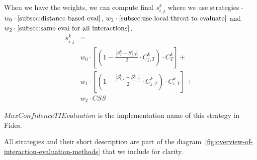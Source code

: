 When we have the weights, we can compute final $s^{k}_{i, j}$ where we use strategies - $w_{0} \cdot \ref{subsec:distance-based-eval}$, $w_{1} \cdot \ref{subsec:use-local-threat-to-evaluate}$ and $w_{2} \cdot \ref{subsec:same-eval-for-all-interactions}$. 
\begin{equation}
\begin{split}
    s^{k}_{i, j} &= \\
    &w_{0} \cdot \left[\left(1 - \frac{|{S}^{k}_{T} - S^{k}_{j, T}|}{2} \cdot C^{k}_{j, T}\right) \cdot C^{k}_{T}\right] + \\
    &w_{1} \cdot \left[\left(1 - \frac{|{S}^{k}_{i, T} - S^{k}_{j, T}|}{2} \cdot C^{k}_{j, T}\right) \cdot C^{k}_{i, T}\right] + \\
    &w_{2} \cdot CSS
\end{split}
\end{equation}

\noindent
$MaxConfidenceTIEvaluation$ is the implementation name of this strategy in Fides.

\vspace{1cm}

\noindent
All strategies and their short description are part of the diagram~\ref{fig:overview-of-interaction-evaluation-methods} that we include for clarity.


